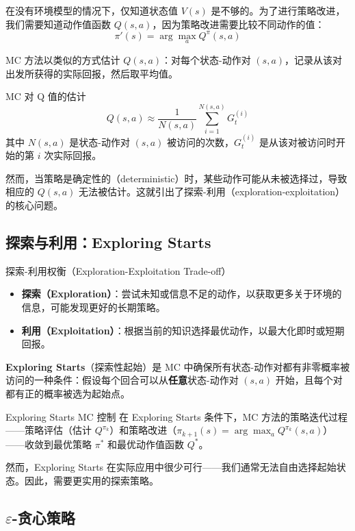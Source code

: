 在没有环境模型的情况下，仅知道状态值 $V(s)$ 是不够的。为了进行策略改进，我们需要知道动作值函数 $Q(s,a)$，因为策略改进需要比较不同动作的值：
$$\pi'(s) = \arg\max_a Q^{\pi}(s,a)$$

MC 方法以类似的方式估计 $Q(s,a)$：对每个状态-动作对 $(s,a)$，记录从该对出发所获得的实际回报，然后取平均值。

\begin{mydefinition}{MC 对 Q 值的估计}
$$Q(s,a) \approx \frac{1}{N(s,a)}\sum_{i=1}^{N(s,a)} G_{t}^{(i)}$$
其中 $N(s,a)$ 是状态-动作对 $(s,a)$ 被访问的次数，$G_{t}^{(i)}$ 是从该对被访问时开始的第 $i$ 次实际回报。
\end{mydefinition}

然而，当策略是确定性的（deterministic）时，某些动作可能从未被选择过，导致相应的 $Q(s,a)$ 无法被估计。这就引出了探索-利用（exploration-exploitation）的核心问题。

\subsection{探索与利用：Exploring Starts}

\begin{mydefinition}{探索-利用权衡（Exploration-Exploitation Trade-off）}
\begin{itemize}
    \item \textbf{探索（Exploration）}：尝试未知或信息不足的动作，以获取更多关于环境的信息，可能发现更好的长期策略。
    \item \textbf{利用（Exploitation）}：根据当前的知识选择最优动作，以最大化即时或短期回报。
\end{itemize}
\end{mydefinition}

\textbf{Exploring Starts}（探索性起始）是 MC 中确保所有状态-动作对都有非零概率被访问的一种条件：假设每个回合可以从\textbf{任意}状态-动作对 $(s,a)$ 开始，且每个对都有正的概率被选为起始点。

\begin{myTheorem}{Exploring Starts MC 控制}
在 Exploring Starts 条件下，MC 方法的策略迭代过程——策略评估（估计 $Q^{\pi_k}$）和策略改进（$\pi_{k+1}(s)=\arg\max_a Q^{\pi_k}(s,a)$）——收敛到最优策略 $\pi^*$ 和最优动作值函数 $Q^*$。
\end{myTheorem}

然而，Exploring Starts 在实际应用中很少可行——我们通常无法自由选择起始状态。因此，需要更实用的探索策略。

\subsection{$\varepsilon$-贪心策略}

